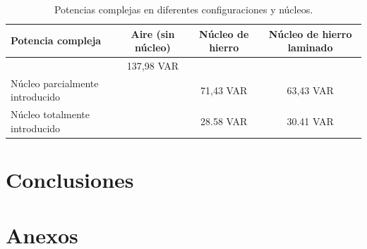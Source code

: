 \documentclass{article}
\begin{document}
            \begin{table}[H]
                \centering
                \begin{tabular}{|l|c|c|c|}
                \hline
                Potencia compleja                    & Aire (sin núcleo)  & Núcleo de hierro & Núcleo de hierro laminado \\ \hline
                                                    &  137,98 VAR        &                  &                     \\ \hline
                Núcleo parcialmente introducido     &                    &  71,43 VAR       &  63,43 VAR          \\ \hline
                Núcleo totalmente introducido       &                    &   28.58 VAR      &  30.41 VAR           \\ \hline
                \end{tabular}
                \caption{Potencias complejas en diferentes configuraciones y núcleos.}
                \label{tab:PotenciasComplejas}
            \end{table}


    \section{Conclusiones}

    \section{Anexos}
\end{document}
